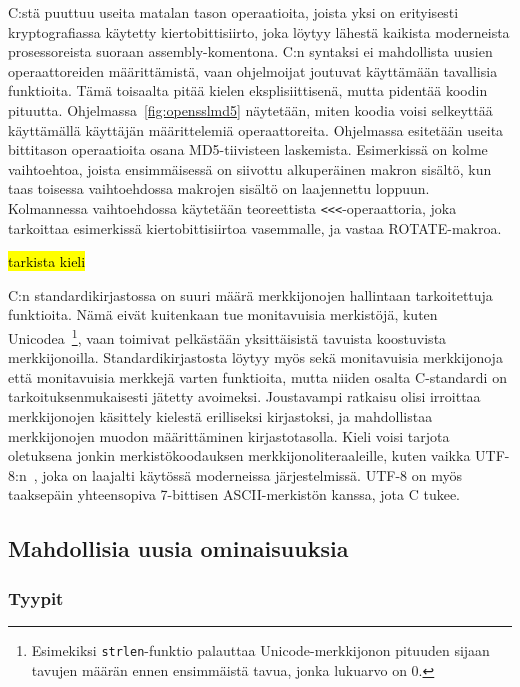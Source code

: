 C:stä puuttuu useita matalan tason operaatioita, joista yksi on erityisesti
kryptografiassa käytetty kiertobittisiirto, joka
löytyy lähestä kaikista moderneista prosessoreista suoraan assembly-komentona.
C:n syntaksi ei mahdollista uusien operaattoreiden määrittämistä, vaan
ohjelmoijat joutuvat käyttämään tavallisia funktioita. Tämä toisaalta pitää
kielen eksplisiittisenä, mutta pidentää koodin pituutta.
Ohjelmassa~\ref{fig:opensslmd5} näytetään, miten koodia voisi selkeyttää
käyttämällä käyttäjän määrittelemiä operaattoreita. Ohjelmassa esitetään useita
bittitason operaatioita osana MD5-tiivisteen laskemista. Esimerkissä on kolme
vaihtoehtoa, joista ensimmäisessä on siivottu alkuperäinen makron sisältö, kun
taas toisessa vaihtoehdossa makrojen sisältö on laajennettu loppuun.
Kolmannessa vaihtoehdossa käytetään teoreettista \texttt{<<<}-operaattoria,
joka tarkoittaa esimerkissä kiertobittisiirtoa vasemmalle, ja vastaa
ROTATE-makroa.

\hl{tarkista kieli}

C:n standardikirjastossa on suuri määrä merkkijonojen hallintaan tarkoitettuja
funktioita. Nämä eivät kuitenkaan tue monitavuisia merkistöjä, kuten Unicodea~\citep{unicode11}\footnote{Esimekiksi
\texttt{strlen}-funktio palauttaa Unicode-merkkijonon pituuden sijaan tavujen
määrän ennen ensimmäistä tavua, jonka lukuarvo on 0.}, vaan toimivat pelkästään
yksittäisistä tavuista koostuvista merkkijonoilla. Standardikirjastosta löytyy
myös sekä monitavuisia merkkijonoja että monitavuisia merkkejä varten
funktioita, mutta niiden osalta C-standardi on tarkoituksenmukaisesti jätetty
avoimeksi. Joustavampi ratkaisu olisi irroittaa merkkijonojen käsittely
kielestä erilliseksi kirjastoksi, ja mahdollistaa merkkijonojen muodon
määrittäminen kirjastotasolla. Kieli voisi tarjota oletuksena jonkin
merkistökoodauksen merkkijonoliteraaleille, kuten vaikka
UTF-8:n~\citep[s. 36]{unicode11}, joka on laajalti käytössä moderneissa
järjestelmissä. UTF-8 on myös taaksepäin yhteensopiva 7-bittisen
ASCII-merkistön kanssa, jota C tukee.

\FloatBarrier

\newpage

\subsection{Mahdollisia uusia ominaisuuksia}

\subsubsection{Tyypit}

